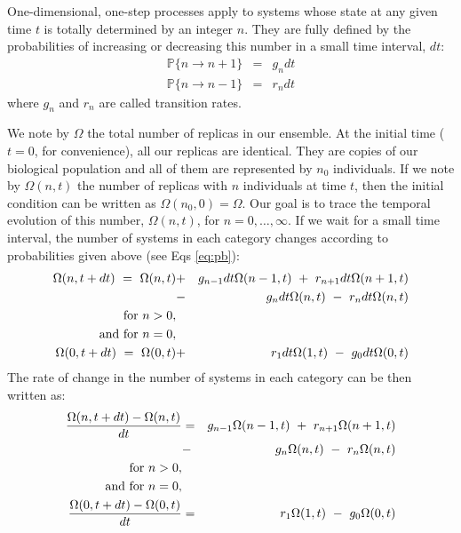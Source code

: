 \documentclass{article}
\newcommand{\Pb}{{\mathbb P}}
\begin{document}
One-dimensional, one-step processes apply to systems whose state at any given time $t$ is totally determined by an integer $n$. They are fully defined by the probabilities of increasing or decreasing this number in a small time interval, $dt$:
\begin{eqnarray}
    \Pb\{ n \longrightarrow n+1 \} & = & g_n dt \nonumber\\
    \Pb\{ n \longrightarrow n-1 \} & = & r_n dt
\label{eq:pb}
\end{eqnarray}
where $g_n$ and $r_n$ are called transition rates. 
\smallskip

We note by $\Omega$ the total number of replicas in our ensemble. At the initial time ($t=0$, for convenience), all our replicas are identical. They are copies of our biological population and all of them are represented by $n_0$ individuals. If we note by $\Omega(n,t)$ the number of replicas with $n$ individuals at time $t$, then the initial condition can be written as $\Omega(n_0,0)=\Omega$. Our goal is to trace the temporal evolution of this number, $\Omega(n,t)$, for $n=0, \dots, \infty$. If we wait for a small time interval, the number of systems in each category changes according to probabilities given above (see Eqs \ref{eq:pb}):
\begin{eqnarray}
\Omega(n,t+dt) \,\, = \,\, \Omega(n,t)  & + & g_{n-1} dt \Omega(n-1,t) \,\, + \,\, r_{n+1} dt \Omega(n+1,t) \nonumber \\
& - & g_n dt \Omega(n,t) \,\, - \,\,r_n dt \Omega(n,t)                  \nonumber \\
\textup{for} \,\, n > 0,      &
&                                                                       \nonumber\\       
\textup{and for} \,\, n = 0,  &   &                                                                       \nonumber \\
\Omega(0,t+dt) \,\, = \,\, \Omega(0,t)  & + & r_1 dt \Omega(1,t) \,\, - \,\, g_0 dt \Omega(0,t)             
\end{eqnarray}
The rate of change in the number of systems in each category can be then written as:
\begin{eqnarray}
\frac{\Omega(n,t+dt) - \Omega(n,t)}{dt} & = & g_{n-1} \Omega(n-1,t) \,\, + \,\, r_{n+1} \Omega(n+1,t) \nonumber \\
& - & g_n \Omega(n,t) \,\, - \,\, r_n  \Omega(n,t)            \nonumber \\
\textup{for} \,\, n > 0,                &   &                                                         \nonumber \\        
\textup{and for} \,\, n = 0,            &   &                                                         \nonumber \\
\frac{\Omega(0,t+dt) - \Omega(0,t)}{dt} & = & r_1  \Omega(1,t) \,\, - \,\, g_0 \Omega(0,t)             
\end{eqnarray}
\end{document}
